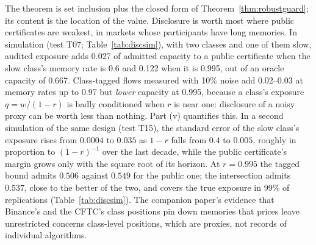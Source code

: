 The theorem is set inclusion plus the closed form of Theorem~\ref{thm:robustguard}; its content is the location of the value. Disclosure is worth most where public certificates are weakest, in markets whose participants have long memories. In simulation (test T07; Table~\ref{tab:discsim}), with two classes and one of them slow, audited exposure adds 0.027 of admitted capacity to a public certificate when the slow class's memory rate is 0.6 and 0.122 when it is 0.995, out of an oracle capacity of 0.667. Class-tagged flows measured with 10\% noise add 0.02--0.03 at memory rates up to 0.97 but \emph{lower} capacity at 0.995, because a class's exposure $q=w/(1-r)$ is badly conditioned when $r$ is near one: disclosure of a noisy proxy can be worth less than nothing. Part (v) quantifies this. In a second simulation of the same design (test T15), the standard error of the slow class's exposure rises from $0.0004$ to $0.035$ as $1-r$ falls from $0.4$ to $0.005$, roughly in proportion to $(1-r)^{-1}$ over the last decade, while the public certificate's margin grows only with the square root of its horizon. At $r=0.995$ the tagged bound admits $0.506$ against $0.549$ for the public one; the intersection admits $0.537$, close to the better of the two, and covers the true exposure in 99\% of replications (Table~\ref{tab:discsim}). The companion paper's evidence that Binance's and the CFTC's class positions pin down memories that prices leave unrestricted concerns class-level positions, which are proxies, not records of individual algorithms.

